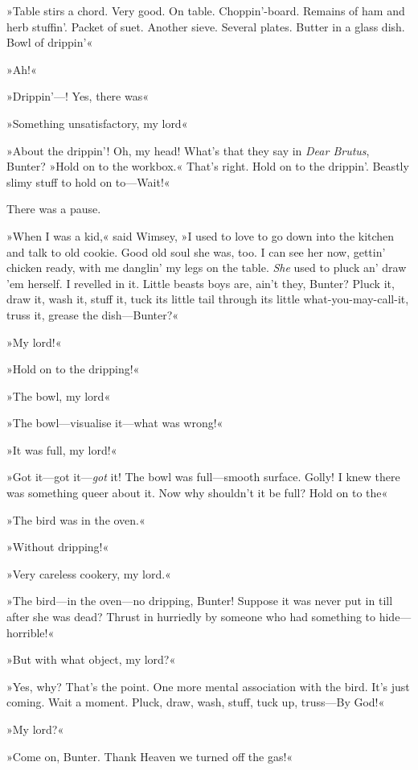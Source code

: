 »Table stirs a chord. Very good. On table. Choppin'-board. Remains of ham and herb stuffin'. Packet of suet. Another sieve. Several plates. Butter in a glass dish. Bowl of drippin'\longdash«

»Ah!«

»Drippin'—! Yes, there was\longdash«

»Something unsatisfactory, my lord\longdash«

»About the drippin'! Oh, my head! What's that they say in \textit{Dear Brutus}, Bunter? »Hold on to the workbox.« That's right. Hold on to the drippin'. Beastly slimy stuff to hold on to—Wait!«

There was a pause.

»When I was a kid,« said Wimsey, »I used to love to go down into the kitchen and talk to old cookie. Good old soul she was, too. I can see her now, gettin' chicken ready, with me danglin' my legs on the table. \textit{She} used to pluck an' draw 'em herself. I revelled in it. Little beasts boys are, ain't they, Bunter? Pluck it, draw it, wash it, stuff it, tuck its little tail through its little what-you-may-call-it, truss it, grease the dish—Bunter?«

»My lord!«

»Hold on to the dripping!«

»The bowl, my lord\longdash«

»The bowl—visualise it—what was wrong!«

»It was full, my lord!«

»Got it—got it—\textit{got} it! The bowl was full—smooth surface. Golly! I knew there was something queer about it. Now why shouldn't it be full? Hold on to the\longdash«

»The bird was in the oven.«

»Without dripping!«

»Very careless cookery, my lord.«

»The bird—in the oven—no dripping, Bunter! Suppose it was never put in till after she was dead? Thrust in hurriedly by someone who had something to hide—horrible!«

»But with what object, my lord?«

»Yes, why? That's the point. One more mental association with the bird. It's just coming. Wait a moment. Pluck, draw, wash, stuff, tuck up, truss—By God!«

»My lord?«

»Come on, Bunter. Thank Heaven we turned off the gas!«

